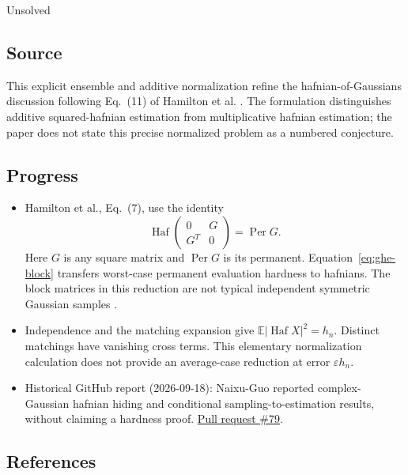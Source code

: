 Unsolved

\subsection*{Source}

This explicit ensemble and additive normalization refine the hafnian-of-Gaussians discussion following Eq.~(11) of Hamilton et al. .
The formulation distinguishes additive squared-hafnian estimation from multiplicative hafnian estimation; the paper does not state this precise normalized problem as a numbered conjecture.

\subsection*{Progress}

\begin{itemize}
  \item Hamilton et al., Eq.~(7), use the identity
\begin{equation}
 \operatorname{Haf}\begin{pmatrix}0&G\\G^T&0\end{pmatrix}
 =\operatorname{Per}G.
 \label{eq:ghe-block}
\end{equation}
Here $G$ is any square matrix and $\operatorname{Per}G$ is its permanent.
Equation~\eqref{eq:ghe-block} transfers worst-case permanent evaluation hardness to hafnians.
The block matrices in this reduction are not typical independent symmetric Gaussian samples .

  \item Independence and the matching expansion give $\mathbb E|\operatorname{Haf}X|^2=h_n$.
Distinct matchings have vanishing cross terms.
This elementary normalization calculation does not provide an average-case reduction at error $\varepsilon h_n$.

  \item Historical GitHub report (2026-09-18): Naixu-Guo reported complex-Gaussian hafnian hiding and conditional sampling-to-estimation results, without claiming a hardness proof. \href{https://github.com/Naixu-Guo/quantum-open-problems/pull/79}{Pull request \#79}.
\end{itemize}

\subsection*{References}

